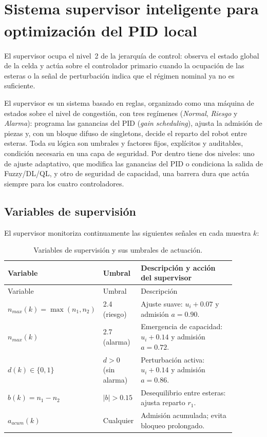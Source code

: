 \chapter[Sistema supervisor inteligente]{Sistema supervisor inteligente para optimización del PID local\textsuperscript{\normalfont *}}
\label{ch:supervisor}
\begingroup\renewcommand\thefootnote{*}\renewcommand{}\endgroup

El supervisor ocupa el nivel~2 de la jerarquía de control: observa el estado global de la celda y actúa sobre el controlador primario cuando la ocupación de las esteras o la señal de perturbación indica que el régimen nominal ya no es suficiente.

El supervisor es un sistema basado en reglas, organizado como una máquina de estados sobre el nivel de congestión, con tres regímenes (\emph{Normal}, \emph{Riesgo} y \emph{Alarma}): programa las ganancias del PID (\emph{gain scheduling}), ajusta la admisión de piezas y, con un bloque difuso de singletons, decide el reparto del robot entre esteras. Toda su lógica son umbrales y factores fijos, explícitos y auditables, condición necesaria en una capa de seguridad. Por dentro tiene dos niveles: uno de ajuste adaptativo, que modifica las ganancias del PID o condiciona la salida de Fuzzy/DL/QL, y otro de seguridad de capacidad, una barrera dura que actúa siempre para los cuatro controladores.

\section{Variables de supervisión}

El supervisor monitoriza continuamente las siguientes señales en cada muestra $k$:

\begin{longtable}{@{}P{0.20\linewidth}P{0.15\linewidth}P{0.53\linewidth}@{}}
\caption{Variables de supervisión y sus umbrales de actuación.}
\label{tab:sv_variables}\\
\toprule
Variable & Umbral & Descripción y acción del supervisor \\ \midrule \endfirsthead
\toprule Variable & Umbral & Descripción \\ \midrule \endhead
$n_{max}(k) = \max(n_1,n_2)$ & 2.4 (riesgo) & Ajuste suave: $u_i\!+\!0.07$ y admisión $a=0.90$.\\
$n_{max}(k)$ & 2.7 (alarma) & Emergencia de capacidad: $u_i\!+\!0.14$ y admisión $a=0.72$.\\
$d(k) \in \{0,1\}$ & $d > 0$ (sin alarma) & Perturbación activa: $u_i\!+\!0.14$ y admisión $a=0.86$.\\
$b(k) = n_1 - n_2$ & $|b| > 0.15$ & Desequilibrio entre esteras: ajusta reparto $r_1$.\\
$a_{acum}(k)$ & Cualquier & Admisión acumulada; evita bloqueo prolongado.\\
\bottomrule
\end{longtable}

